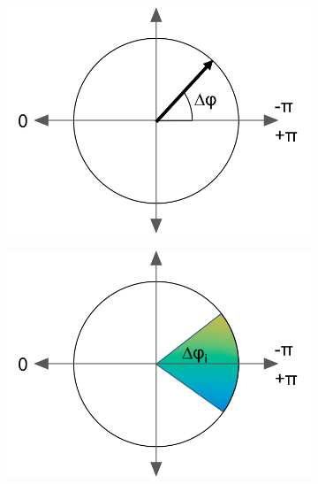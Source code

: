 \begin{figure}
	\centering
	\begin{subfigure}{0.25\textwidth}
		\centering
		\includegraphics[width=\textwidth]{figures/cplx_phasedif_phasor.png}
	\end{subfigure}
	\quad
	\begin{subfigure}{0.25\textwidth}
		\centering
		\includegraphics[width=\textwidth]{figures/cplx_phasedif_segment.png}
	\end{subfigure}
	\quad
	\begin{subfigure}{0.25\textwidth}
		\centering

\end{subfigure}
\end{figure}

